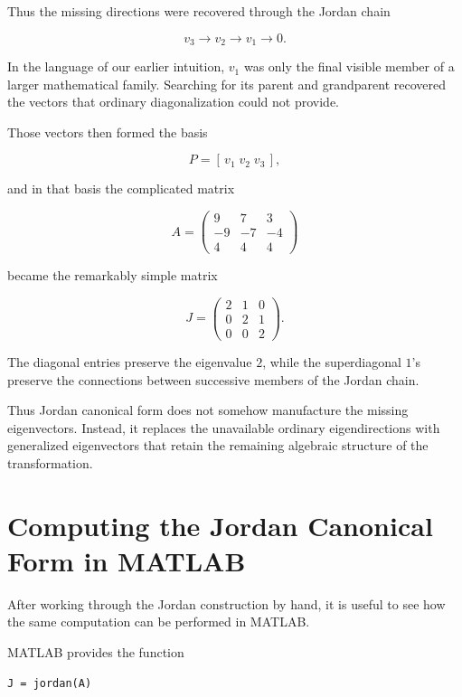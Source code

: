 \documentclass[11pt]{article}
\begin{document}
Thus the missing directions were recovered through the Jordan chain

\[
\boxed{
v_3
\longrightarrow
v_2
\longrightarrow
v_1
\longrightarrow
0.
}
\]

In the language of our earlier intuition, \(v_1\) was only the final
visible member of a larger mathematical family.  Searching for its
parent and grandparent recovered the vectors that ordinary
diagonalization could not provide.

Those vectors then formed the basis

\[
P=[\,v_1\;v_2\;v_3\,],
\]

and in that basis the complicated matrix

\[
A=
\begin{pmatrix}
9&7&3\\
-9&-7&-4\\
4&4&4
\end{pmatrix}
\]

became the remarkably simple matrix

\[
\boxed{
J=
\begin{pmatrix}
2&1&0\\
0&2&1\\
0&0&2
\end{pmatrix}.
}
\]

The diagonal entries preserve the eigenvalue \(2\), while the
superdiagonal \(1\)'s preserve the connections between successive
members of the Jordan chain.

Thus Jordan canonical form does not somehow manufacture the missing
eigenvectors.  Instead, it replaces the unavailable ordinary
eigendirections with generalized eigenvectors that retain the
remaining algebraic structure of the transformation.

\section{Computing the Jordan Canonical Form in MATLAB}

After working through the Jordan construction by hand, it is useful to
see how the same computation can be performed in MATLAB.

MATLAB provides the function

\begin{verbatim}
J = jordan(A)
\end{verbatim}
\end{document}

